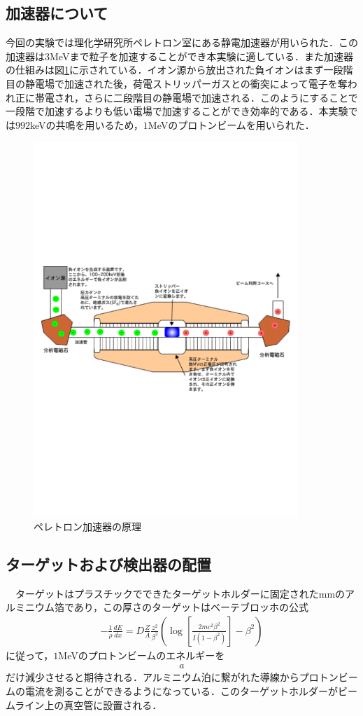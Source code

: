 \documentclass[a4j]{jarticle}
\begin{document}
\subsection{加速器について}
今回の実験では理化学研究所ペレトロン室にある静電加速器が用いられた．この加速器は$3$MeVまで粒子を加速することができ本実験に適している．また加速器の仕組みは図\ref{035816_3Sep18}に示されている．イオン源から放出された負イオンはまず一段階目の静電場で加速された後，荷電ストリッパーガスとの衝突によって電子を奪われ正に帯電され，さらに二段階目の静電場で加速される．このようにすることで一段階で加速するよりも低い電場で加速することができ効率的である．本実験では$992$keVの共鳴を用いるため，$1$MeVのプロトンビームを用いられた．
\begin{figure}[htb]
 \centering
 \includegraphics[bb=17 280 578 562,width=10cm]{tandem.pdf}
 \caption{ペレトロン加速器の原理}
 \label{035816_3Sep18}
\end{figure}


\subsection{ターゲットおよび検出器の配置}
　ターゲットはプラスチックでできたターゲットホルダーに固定されたmmのアルミニウム箔であり，この厚さのターゲットはベーテブロッホの公式
\begin{align*}
 -\frac{1}{\rho}\frac{dE}{dx}=D\frac{Z}{A}\frac{z^2}{\beta^2}\left(\log\left[\frac{2mc^2\beta^2}{I(1-\beta^2)}\right]-\beta^2\right)
\end{align*}
に従って，$1$MeVのプロトンビームのエネルギーを
\begin{align*}
 a
\end{align*}
だけ減少させると期待される．アルミニウム泊に繋がれた導線からプロトンビームの電流を測ることができるようになっている．このターゲットホルダーがビームライン上の真空管に設置される．
\end{document}
